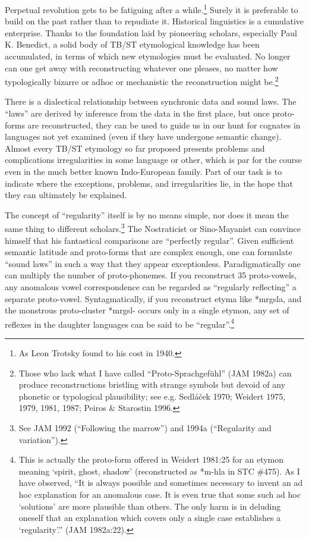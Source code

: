Perpetual revolution gets to be fatiguing after a while.\footnote{As Leon Trotsky found to his cost in 1940.} Surely it is preferable to build on the past rather than to repudiate it. Historical linguistics is a cumulative enterprise. Thanks to the foundation laid by pioneering scholars, especially Paul K. Benedict, a solid body of TB/ST etymological knowledge has been accumulated, in terms of which new etymologies must be evaluated. No longer can one get away with reconstructing whatever one pleases, no matter how typologically bizarre or adhoc or mechanistic the reconstruction might be.\footnote{Those who lack what I have called “Proto-Sprachgefühl” (JAM 1982a) can produce reconstructions bristling with strange symbols but devoid of any phonetic or typological plausibility; see e.g. Sedláček 1970; Weidert 1975, 1979, 1981, 1987; Peiros \& Starostin 1996.}

There is a dialectical relationship between synchronic data and sound laws. The ``laws'' are derived by inference from the data in the first place, but once proto-forms are reconstructed, they can be used to guide us in our hunt for cognates in languages not yet examined (even if they have undergone semantic change). Almost every TB/ST etymology so far proposed presents problems and complications  irregularities  in some language or other, which is par for the course even in the much better known Indo-European family. Part of our task is to indicate where the exceptions, problems, and irregularities lie, in the hope that they can ultimately be explained.

The concept of ``regularity'' itself is by no means simple, nor does it mean the same thing to different scholars.\footnote{See JAM 1992 (“Following the marrow”) and 1994a (“Regularity and variation”).} The Nostraticist or Sino-Mayanist can convince himself that his fantastical comparisons are ``perfectly regular''. Given sufficient semantic latitude and proto-forms that are complex enough, one can formulate ``sound laws'' in such a way that they appear exceptionless. Paradigmatically one can multiply the number of proto-phonemes. If you reconstruct 35 proto-vowels, any anomalous vowel correspondence can be regarded as ``regularly reflecting'' a separate proto-vowel. Syntagmatically, if you reconstruct etyma like *mrgsla, and the monstrous proto-cluster *mrgsl- occurs only in a single etymon, any set of reflexes in the daughter languages can be said to be ``regular''.\footnote{This is actually the proto-form offered in Weidert 1981:25 for an etymon meaning ‘spirit, ghost, shadow’ (reconstructed as *m-hla in STC \#475). As I have observed, “It is always possible and sometimes necessary to invent an ad hoc explanation for an anomalous case. It is even true that some such ad hoc ‘solutions’ are more plausible than others. The only harm is in deluding oneself that an explanation which covers only a single case establishes a ‘regularity’.” (JAM 1982a:22).}

